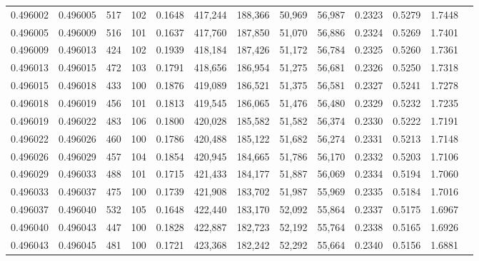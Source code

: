 \begin{tabular}{rrrrrrrrrrrrr}
0.496002 & 0.496005 &   517 & 102 &                                     0.1648 & 417,244 & 188,366 &  50,969 &  56,987 & 0.2323 & 0.5279 & 1.7448 \\
0.496005 & 0.496009 &   516 & 101 &                                     0.1637 & 417,760 & 187,850 &  51,070 &  56,886 & 0.2324 & 0.5269 & 1.7401 \\
0.496009 & 0.496013 &   424 & 102 &                                     0.1939 & 418,184 & 187,426 &  51,172 &  56,784 & 0.2325 & 0.5260 & 1.7361 \\
0.496013 & 0.496015 &   472 & 103 &                                     0.1791 & 418,656 & 186,954 &  51,275 &  56,681 & 0.2326 & 0.5250 & 1.7318 \\
0.496015 & 0.496018 &   433 & 100 &                                     0.1876 & 419,089 & 186,521 &  51,375 &  56,581 & 0.2327 & 0.5241 & 1.7278 \\
0.496018 & 0.496019 &   456 & 101 &                                     0.1813 & 419,545 & 186,065 &  51,476 &  56,480 & 0.2329 & 0.5232 & 1.7235 \\
0.496019 & 0.496022 &   483 & 106 &                                     0.1800 & 420,028 & 185,582 &  51,582 &  56,374 & 0.2330 & 0.5222 & 1.7191 \\
0.496022 & 0.496026 &   460 & 100 &                                     0.1786 & 420,488 & 185,122 &  51,682 &  56,274 & 0.2331 & 0.5213 & 1.7148 \\
0.496026 & 0.496029 &   457 & 104 &                                     0.1854 & 420,945 & 184,665 &  51,786 &  56,170 & 0.2332 & 0.5203 & 1.7106 \\
0.496029 & 0.496033 &   488 & 101 &                                     0.1715 & 421,433 & 184,177 &  51,887 &  56,069 & 0.2334 & 0.5194 & 1.7060 \\
0.496033 & 0.496037 &   475 & 100 &                                     0.1739 & 421,908 & 183,702 &  51,987 &  55,969 & 0.2335 & 0.5184 & 1.7016 \\
0.496037 & 0.496040 &   532 & 105 &                                     0.1648 & 422,440 & 183,170 &  52,092 &  55,864 & 0.2337 & 0.5175 & 1.6967 \\
0.496040 & 0.496043 &   447 & 100 &                                     0.1828 & 422,887 & 182,723 &  52,192 &  55,764 & 0.2338 & 0.5165 & 1.6926 \\
0.496043 & 0.496045 &   481 & 100 &                                     0.1721 & 423,368 & 182,242 &  52,292 &  55,664 & 0.2340 & 0.5156 & 1.6881 \\

\end{tabular}
